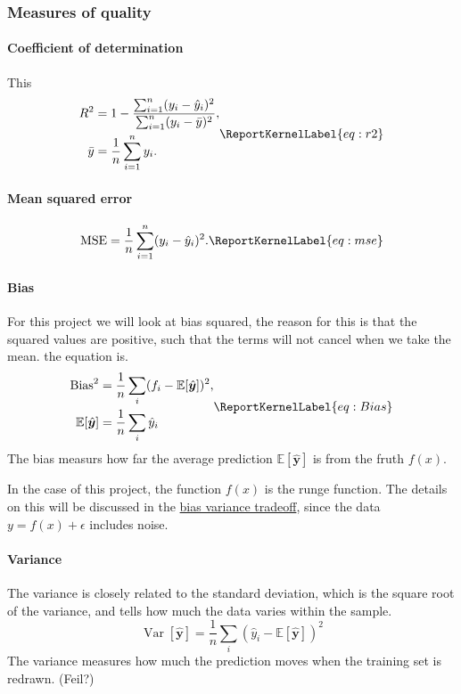 \documentclass[aps,rmp,reprint,raggedbottom,amsmath,amssymb,longbibliography]{revtex4-1}
\let\label\ReportKernelLabel
\begin{document}
\subsubsection{Measures of quality}
\label{sec:PF}
\paragraph{Coefficient of determination}
This
\begin{equation}
\begin{aligned}
R^2 &= 1-\frac{\sum_{i=1}^{n}(y_i-\hat{y}_i)^2}
          {\sum_{i=1}^{n}(y_i-\bar{y})^2},
\\
\bar{y} &= \frac{1}{n}\sum_{i=1}^{n}y_i.
\end{aligned}
\label{eq:r2}
\end{equation}

\paragraph{Mean squared error}
\begin{equation}
\mathrm{MSE}
= \frac{1}{n}\sum_{i=1}^{n}(y_i-\hat{y}_i)^2.
\label{eq:mse}
\end{equation}

\paragraph{Bias}
For this project we will look at bias squared, the reason for this
is that the squared values are positive, such that the terms will not
cancel when we take the mean. the equation is.
\begin{equation}
  \begin{aligned}
  \mathrm{Bias}^2 &= \frac{1}{n}\sum_{i}(f_i - \mathbb{E}[\hat{\boldsymbol{y}}])^2, \\
  \mathbb{E}[\hat{\boldsymbol{y}}] &= \frac{1}{n}\sum_{i} \hat{y}_i
  \end{aligned}
  \label{eq:Bias}
\end{equation}
The bias measurs how far the average prediction $\mathbb{E}[\hat{\boldsymbol{y}}]$
is from the fruth $f(x)$. \cite[p.~61-62]{LectureNotes}

In the case of this project, the function $f(x)$ is the runge function.
The details on this will be discussed in the \hyperref[sec:BV]{bias variance tradeoff},
since the data $y = f(x) + \epsilon$ includes noise.

\paragraph{Variance}
The variance is closely related to the standard deviation, which is
the square root of the variance, and tells how much the data varies
within the sample.
\begin{equation}
  \operatorname{Var}[\hat{\boldsymbol{y}}]
  = \frac{1}{n}\sum_{i}(\hat{y}_i - \mathbb{E}[\hat{\boldsymbol{y}}])^2
\end{equation} \cite[p.~62]{LectureNotes}
The variance measures how much the prediction moves when the training set is
redrawn. (Feil?)
\end{document}
